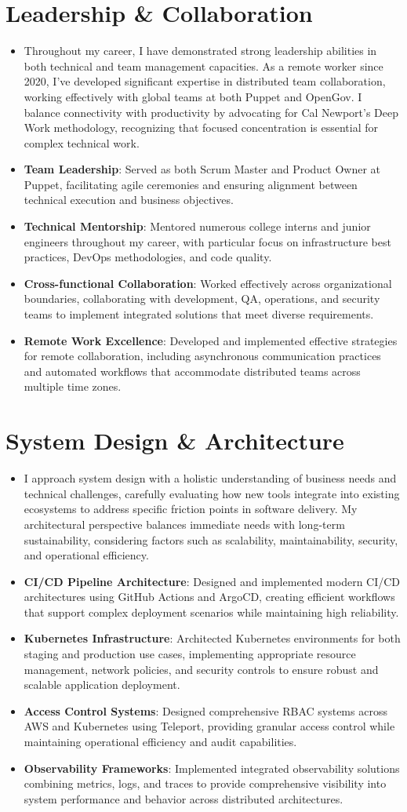 \documentclass[letterpaper,11pt]{article}
\newcommand{\resumeItem}[2]{
\item[\textsc{}]\small{
    \textbf{#1}{: #2 \vspace{-2pt}}
  }
}
\newcommand{\resumeItemListStart}{\begin{itemize}}
\newcommand{\resumeItemListEnd}{\end{itemize}\vspace{-5pt}}
\newcommand{\resumeParagraph}[1]{
  \vspace{-5pt}
  \begin{itemize}[leftmargin=*]
  \item[]
    #1
  \end{itemize}
  \vspace{-5pt}
}
\begin{document}
\section{Leadership \& Collaboration}
\resumeParagraph{
Throughout my career, I have demonstrated strong leadership abilities in both technical and team management capacities. As a remote worker since 2020, I've developed significant expertise in distributed team collaboration, working effectively with global teams at both Puppet and OpenGov. I balance connectivity with productivity by advocating for Cal Newport's Deep Work methodology, recognizing that focused concentration is essential for complex technical work.
}
\resumeItemListStart
  \resumeItem{Team Leadership}
    {Served as both Scrum Master and Product Owner at Puppet, facilitating agile ceremonies and ensuring alignment between technical execution and business objectives.}
  \resumeItem{Technical Mentorship}
    {Mentored numerous college interns and junior engineers throughout my career, with particular focus on infrastructure best practices, DevOps methodologies, and code quality.}
  \resumeItem{Cross-functional Collaboration}
    {Worked effectively across organizational boundaries, collaborating with development, QA, operations, and security teams to implement integrated solutions that meet diverse requirements.}
  \resumeItem{Remote Work Excellence}
    {Developed and implemented effective strategies for remote collaboration, including asynchronous communication practices and automated workflows that accommodate distributed teams across multiple time zones.}
\resumeItemListEnd

\section{System Design \& Architecture}
\resumeParagraph{
I approach system design with a holistic understanding of business needs and technical challenges, carefully evaluating how new tools integrate into existing ecosystems to address specific friction points in software delivery. My architectural perspective balances immediate needs with long-term sustainability, considering factors such as scalability, maintainability, security, and operational efficiency.
}
\resumeItemListStart
  \resumeItem{CI/CD Pipeline Architecture}
    {Designed and implemented modern CI/CD architectures using GitHub Actions and ArgoCD, creating efficient workflows that support complex deployment scenarios while maintaining high reliability.}
  \resumeItem{Kubernetes Infrastructure}
    {Architected Kubernetes environments for both staging and production use cases, implementing appropriate resource management, network policies, and security controls to ensure robust and scalable application deployment.}
  \resumeItem{Access Control Systems}
    {Designed comprehensive RBAC systems across AWS and Kubernetes using Teleport, providing granular access control while maintaining operational efficiency and audit capabilities.}
  \resumeItem{Observability Frameworks}
    {Implemented integrated observability solutions combining metrics, logs, and traces to provide comprehensive visibility into system performance and behavior across distributed architectures.}
\resumeItemListEnd
\end{document}
